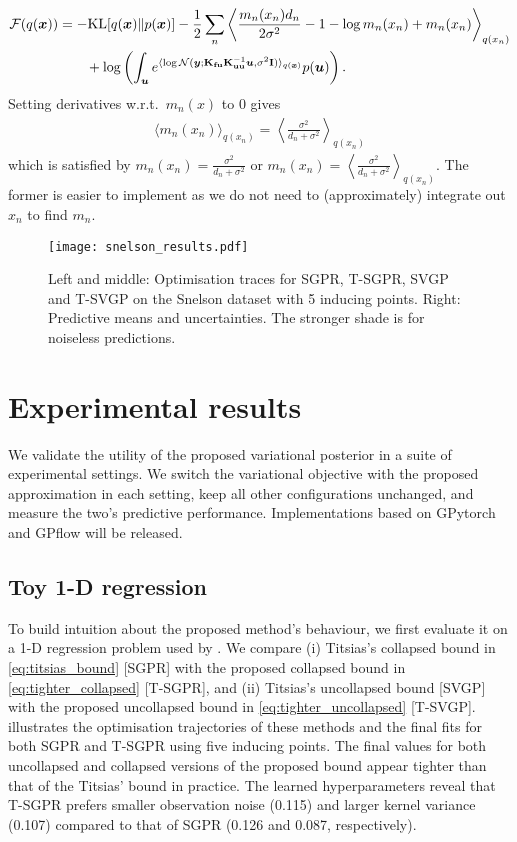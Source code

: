 \begin{align}
    {\mathcal{F}}(q({\bm{x}}))
    &= -\mathrm{KL} [q({\bm{x}}) \| p({\bm{x}})] - \frac{1}{2} \sum_n \left \langle \frac{m_n(x_n) d_n}{2\sigma^2} - 1 - \log m_n(x_n) + m_n(x_n)\right \rangle_{q(x_n)} \nonumber \\ & \qquad + \log \left( \int_{{\bm{u}}} e^{\langle \log {\mathcal{N}}({\bm{y}}; \mathbf{K}_{\mathbf{fu}} \mathbf{K}_{\mathbf{uu}}^{-1} {\bm{u}}, \sigma^2 {\mathbf{I}}) \rangle_{q({\bm{x}})}} p({\bm{u}})\right). \nonumber
\end{align}
Setting derivatives w.r.t.\ $m_n(x)$ to 0 gives
\begin{align}
    \langle m_n(x_n) \rangle_{q(x_n)} = \left\langle \frac{\sigma^2}{d_n + \sigma^2} \right\rangle_{q(x_n)} \nonumber
\end{align}
which is satisfied by $m_n(x_n) = \frac{\sigma^2}{d_n + \sigma^2}$ or $m_n(x_n) = \left\langle \frac{\sigma^2}{d_n + \sigma^2} \right\rangle_{q(x_n)}$. The former is easier to implement as we do not need to (approximately) integrate out $x_n$ to find $m_n$.


\begin{figure}[t]
    \centering
    \texttt{[image: snelson\_results.pdf]}
    \caption{Left and middle: Optimisation traces for SGPR, T-SGPR, SVGP and T-SVGP on the Snelson dataset with 5 inducing points. Right: Predictive means and uncertainties. The stronger shade is for noiseless predictions.}
    \label{fig:snelson}
\end{figure}

\section{Experimental results}
We validate the utility of the proposed variational posterior in a suite of experimental settings. We switch the variational objective with the proposed approximation in each setting, keep all other configurations unchanged, and measure the two's predictive performance. Implementations based on GPytorch and GPflow will be released.

\subsection{Toy 1-D regression}
To build intuition about the proposed method's behaviour, we first evaluate it on a 1-D regression problem used by \cite{snelson2005sparse}. We compare (i) Titsias's collapsed bound in \cref{eq:titsias_bound} [SGPR] with the proposed collapsed bound in \cref{eq:tighter_collapsed} [T-SGPR], and (ii) Titsias's uncollapsed bound [SVGP] with the proposed uncollapsed bound in \cref{eq:tighter_uncollapsed} [T-SVGP].  illustrates the optimisation trajectories of these methods and the final fits for both SGPR and T-SGPR using five inducing points. The final values for both uncollapsed and collapsed versions of the proposed bound appear tighter than that of the Titsias' bound in practice. The learned hyperparameters reveal that T-SGPR prefers smaller observation noise (0.115) and larger kernel variance (0.107) compared to that of SGPR (0.126 and 0.087, respectively).


